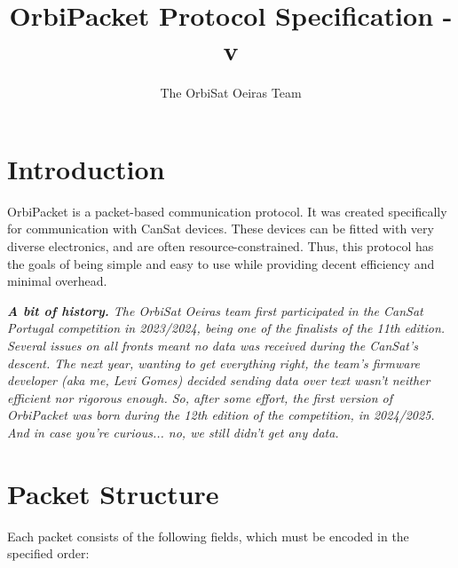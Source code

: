 \documentclass[a4paper,11pt,english]{article}
\title{OrbiPacket Protocol Specification - v\version}
\author{The OrbiSat Oeiras Team}
\begin{document}
\maketitle
\tableofcontents

\section{Introduction}

OrbiPacket is a packet-based communication protocol. It was created specifically for communication with CanSat devices. These devices can be fitted with very diverse electronics, and are often resource-constrained. Thus, this protocol has the goals of being simple and easy to use while providing decent efficiency and minimal overhead.

\textit{\textbf{A bit of history.} The OrbiSat Oeiras team first participated in the CanSat Portugal competition in 2023/2024, being one of the finalists of the 11th edition. Several issues on all fronts meant no data was received during the CanSat's descent. The next year, wanting to get everything right, the team's firmware developer (aka me, Levi Gomes) decided sending data over text wasn't neither efficient nor rigorous enough. So, after some effort, the first version of OrbiPacket was born during the 12th edition of the competition, in 2024/2025. And in case you're curious... no, we still didn't get any data.}



\section{Packet Structure}

Each packet consists of the following fields, which must be encoded in the specified order:
\end{document}
